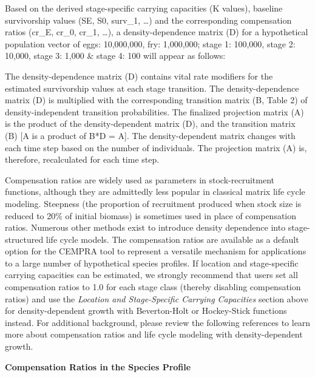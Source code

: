 \documentclass[
  letterpaper,
  DIV=11,
  numbers=noendperiod]{scrreprt}
\begin{document}
Based on the derived stage-specific carrying capacities (K values),
baseline survivorship values (SE, S0, surv\_1, \ldots) and the
corresponding compensation ratios (cr\_E, cr\_0, cr\_1, \ldots), a
density-dependence matrix (D) for a hypothetical population vector of
eggs: 10,000,000, fry: 1,000,000; stage 1: 100,000, stage 2: 10,000,
stage 3: 1,000 \& stage 4: 100 will appear as follows:

The density-dependence matrix (D) contains vital rate modifiers for the
estimated survivorship values at each stage transition. The
density-dependence matrix (D) is multiplied with the corresponding
transition matrix (B, Table 2) of density-independent transition
probabilities. The finalized projection matrix (A) is the product of the
density-dependent matrix (D), and the transition matrix (B) {[}A is a
product of B*D = A{]}. The density-dependent matrix changes with each
time step based on the number of individuals. The projection matrix (A)
is, therefore, recalculated for each time step.

Compensation ratios are widely used as parameters in stock-recruitment
functions, although they are admittedly less popular in classical matrix
life cycle modeling. Steepness (the proportion of recruitment produced
when stock size is reduced to 20\% of initial biomass) is sometimes used
in place of compensation ratios. Numerous other methods exist to
introduce density dependence into stage-structured life cycle models.
The compensation ratios are available as a default option for the CEMPRA
tool to represent a versatile mechanism for applications to a large
number of hypothetical species profiles. If location and stage-specific
carrying capacities can be estimated, we strongly recommend that users
set all compensation ratios to 1.0 for each stage class (thereby
disabling compensation ratios) and use the \emph{Location and
Stage-Specific Carrying Capacities} section above for density-dependent
growth with Beverton-Holt or Hockey-Stick functions instead. For
additional background, please review the following references to learn
more about compensation ratios and life cycle modeling with
density-dependent growth.

\textbf{Compensation Ratios in the Species Profile}
\end{document}
